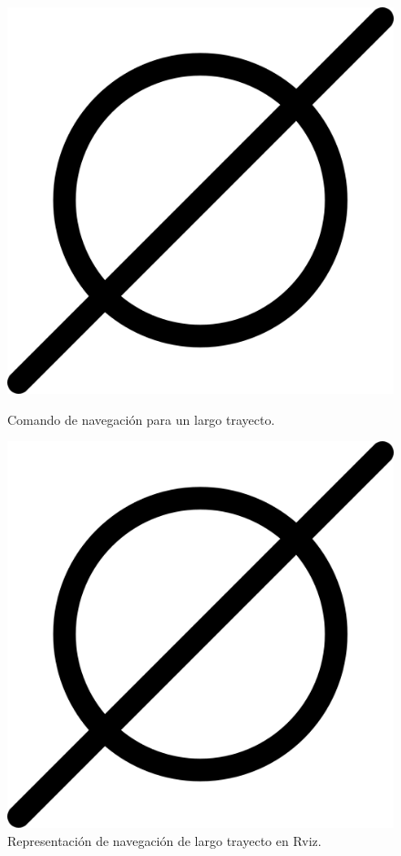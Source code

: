 \begin{figure}[htbp]
  \centering
  \begin{minipage}[b]{0.45\textwidth}
    \centering
    \includegraphics[width=\textwidth]{images/poner_foto.png}
    \caption{Comando de navegación para un largo trayecto.}
    \label{fig:navegacion_largo_web}
  \end{minipage}
  \hfill
  \begin{minipage}[b]{0.45\textwidth}
    \centering
    \includegraphics[width=\textwidth]{images/poner_foto.png}
    \caption{Representación de navegación de largo trayecto en Rviz.}
    \label{fig:navegacion_largo_rviz}
  \end{minipage}
\end{figure}

